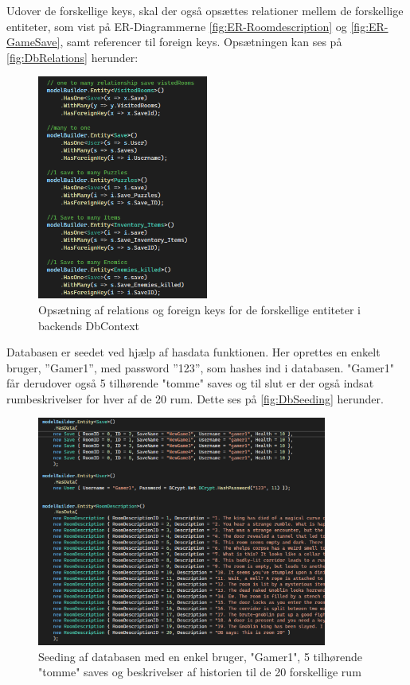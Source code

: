 Udover de forskellige keys, skal der også opsættes relationer mellem de forskellige entiteter, som vist på ER-Diagrammerne \autoref{fig:ER-Roomdescription} og \autoref{fig:ER-GameSave}, samt referencer til foreign keys. 
Opsætningen kan ses på \autoref{fig:DbRelations} herunder: 

\begin{figure}[H]
\centering
\includegraphics[width = 0.5\textwidth]{02-Body/Images/DAL-Database/DbRelations.PNG}
\caption{Opsætning af relations og foreign keys for de forskellige entiteter i backends DbContext}
\label{fig:DbRelations}
\end{figure}

Databasen er seedet ved hjælp af hasdata funktionen. Her oprettes en enkelt bruger, ”Gamer1”, med password ”123”, som hashes ind i databasen. "Gamer1" får derudover også 5 tilhørende "tomme" saves og til slut er der også indsat rumbeskrivelser for hver af de 20 rum. Dette ses på \autoref{fig:DbSeeding} herunder.

\begin{figure}[H]
\centering
\includegraphics[width = 0.85\textwidth]{02-Body/Images/DAL-Database/DbSeeding.PNG}
\caption{Seeding af databasen med en enkel bruger, "Gamer1", 5 tilhørende "tomme" saves og beskrivelser af historien til de 20 forskellige rum}
\label{fig:DbSeeding}
\end{figure}